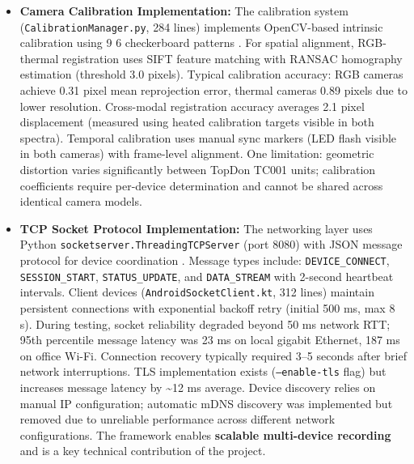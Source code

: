 \begin{itemize}
    \item \textbf{Camera Calibration Implementation:} The calibration system (\texttt{CalibrationManager.py}, 284 lines) implements OpenCV-based intrinsic calibration using 9\,\texttimes\,6 checkerboard patterns \cite{ref22}. For spatial alignment, RGB-thermal registration uses SIFT feature matching with RANSAC homography estimation (threshold 3.0 pixels). Typical calibration accuracy: RGB cameras achieve 0.31 pixel mean reprojection error, thermal cameras 0.89 pixels due to lower resolution. Cross-modal registration accuracy averages 2.1 pixel displacement (measured using heated calibration targets visible in both spectra). Temporal calibration uses manual sync markers (LED flash visible in both cameras) with frame-level alignment. One limitation: geometric distortion varies significantly between TopDon TC001 units; calibration coefficients require per-device determination and cannot be shared across identical camera models.
    \item \textbf{TCP Socket Protocol Implementation:} The networking layer uses Python \texttt{socketserver.ThreadingTCPServer} (port 8080) with JSON message protocol for device coordination \cite{ref21}. Message types include: \texttt{DEVICE\_CONNECT}, \texttt{SESSION\_START}, \texttt{STATUS\_UPDATE}, and \texttt{DATA\_STREAM} with 2-second heartbeat intervals. Client devices (\texttt{AndroidSocketClient.kt}, 312 lines) maintain persistent connections with exponential backoff retry (initial 500 ms, max 8 s). During testing, socket reliability degraded beyond 50 ms network RTT; 95th percentile message latency was 23 ms on local gigabit Ethernet, 187 ms on office Wi-Fi. Connection recovery typically required 3--5 seconds after brief network interruptions. TLS implementation exists (\texttt{--enable-tls} flag) but increases message latency by \textasciitilde{}12 ms average. Device discovery relies on manual IP configuration; automatic mDNS discovery was implemented but removed due to unreliable performance across different network configurations. The framework enables \textbf{scalable multi-device recording} and is a key technical contribution of the project.

\end{itemize}
